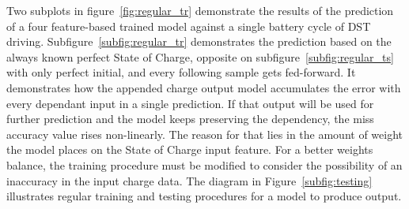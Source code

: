 %
%
Two subplots in figure~\ref{fig:regular_tr} demonstrate the results of the prediction of a four feature-based trained model against a single battery cycle of DST driving.
Subfigure~\ref{subfig:regular_tr} demonstrates the prediction based on the always known perfect State of Charge, opposite on subfigure~\ref{subfig:regular_ts} with only perfect initial, and every following sample gets fed-forward.
It demonstrates how the appended charge output model accumulates the error with every dependant input in a single prediction.
If that output will be used for further prediction and the model keeps preserving the dependency, the miss accuracy value rises non-linearly.
The reason for that lies in the amount of weight the model places on the State of Charge input feature.
For a better weights balance, the training procedure must be modified to consider the possibility of an inaccuracy in the input charge data.
The diagram in Figure~\ref{subfig:testing} illustrates regular training and testing procedures for a model to produce output.

